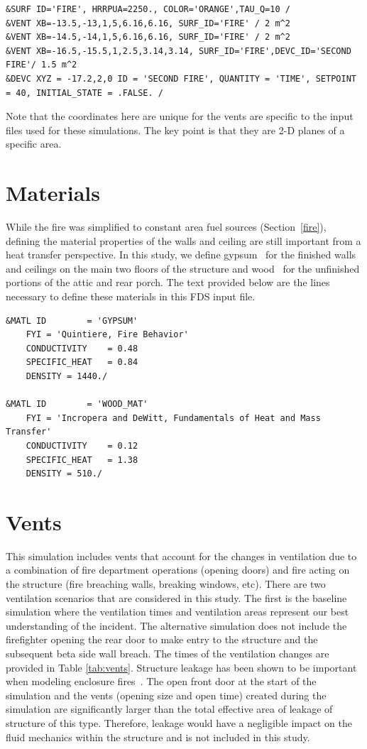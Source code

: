 \documentclass[11pt,oneside]{book}
\begin{document}
\begin{lstlisting}
&SURF ID='FIRE', HRRPUA=2250., COLOR='ORANGE',TAU_Q=10 /
&VENT XB=-13.5,-13,1,5,6.16,6.16, SURF_ID='FIRE' / 2 m^2
&VENT XB=-14.5,-14,1,5,6.16,6.16, SURF_ID='FIRE' / 2 m^2
&VENT XB=-16.5,-15.5,1,2.5,3.14,3.14, SURF_ID='FIRE',DEVC_ID='SECOND FIRE'/ 1.5 m^2
&DEVC XYZ = -17.2,2,0 ID = 'SECOND FIRE', QUANTITY = 'TIME', SETPOINT = 40, INITIAL_STATE = .FALSE. /
\end{lstlisting}
Note that the coordinates here are unique for the vents are specific to the input files used for these simulations. The key point is that they are 2-D planes of a specific area.

\section{Materials}
\label{matl}
While the fire was simplified to constant area fuel sources (Section~\ref{fire}), defining the material properties of the walls and ceiling are still important from a heat transfer perspective. In this study, we define gypsum~\cite{Quintiere:2} for the finished walls and ceilings on the main two floors of the structure and wood~\cite{Incropera:1} for the unfinished portions of the attic and rear porch. The text provided below are the lines necessary to define these materials in this FDS input file.

\begin{lstlisting}
&MATL ID        = 'GYPSUM'
    FYI = 'Quintiere, Fire Behavior' 
    CONDUCTIVITY    = 0.48
    SPECIFIC_HEAT   = 0.84
    DENSITY = 1440./

&MATL ID        = 'WOOD_MAT'
    FYI = 'Incropera and DeWitt, Fundamentals of Heat and Mass Transfer'
    CONDUCTIVITY    = 0.12
    SPECIFIC_HEAT   = 1.38
    DENSITY = 510./ 
\end{lstlisting}

\section{Vents}
\label{Vents}
This simulation includes vents that account for the changes in ventilation due to a combination of fire department operations (opening doors) and fire acting on the structure (fire breaching walls, breaking windows, etc). There are two ventilation scenarios that are considered in this study. The first is the baseline simulation where the ventilation times and ventilation areas represent our best understanding of the incident. The alternative simulation does not include the firefighter opening the rear door to make entry to the structure and the subsequent beta side wall breach. The times of the ventilation changes are provided in Table \ref{tab:vents}. Structure leakage has been shown to be important when modeling enclosure fires~\cite{beal2009}. The open front door at the start of the simulation and the vents (opening size and open time) created during the simulation are significantly larger than the total effective area of leakage of structure of this type. Therefore, leakage would have a negligible impact on the fluid mechanics within the structure and is not included in this study.
\end{document}
